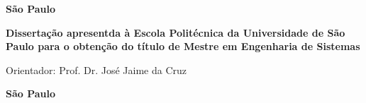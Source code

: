 \pagestyle{empty}

\begin{titlepage}


\begin{center}
{\LARGE \nomedoaluno}
\par
\vspace{200pt}
{\Huge \titulo}
\par
\vfill
\textbf{{\large São Paulo}\\
{\large \the\year}}
\end{center}
\end{titlepage}

\cleardoublepage

\pagestyle{fancy}



\thispagestyle{empty}

\begin{center}
{\LARGE \nomedoaluno}
\par
\vspace{200pt}
{\Huge \titulo}
\end{center}
\par
\vspace{90pt}
\hspace*{175pt}\parbox{7.6cm}{{\large  \textbf{Dissertação apresentda à Escola Politécnica da Universidade de São Paulo para o obtenção do título de Mestre em Engenharia de Sistemas}}}
\par
\vspace{1em}
\hspace*{175pt}\parbox{7.6cm}{{\large Orientador: Prof. Dr. José Jaime da Cruz}}

\par
\vfill
\begin{center}
\textbf{{\large São Paulo}\\
{\large \the\year}}
\end{center}

